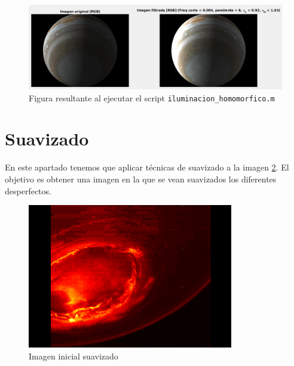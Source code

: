 \documentclass[12pt]{article}
\begin{document}
	\vspace{10px}

	\begin{figure}[h]
		\begin{center}
			\includegraphics[width=1\textwidth]{img/iluminacion_homomorfico.png}
			\caption{Figura resultante al ejecutar el script \texttt{iluminacion\_homomorfico.m}}
			\label{img: iluminacion homomorfico}
		\end{center}
	\end{figure}

	\pagebreak
	
	\section{Suavizado}
	
	\noindent En este apartado tenemos que aplicar técnicas de suavizado a la imagen \ref{img: suavizado src}. El objetivo es obtener una imagen en la que se vean suavizados los diferentes desperfectos.
	
	\begin{figure}[h]
		\begin{center}
			\includegraphics[width=0.8\textwidth]{img/suavizado.jpg}
			\caption{Imagen inicial suavizado}
			\label{img: suavizado src}
		\end{center}
	\end{figure}
\end{document}
